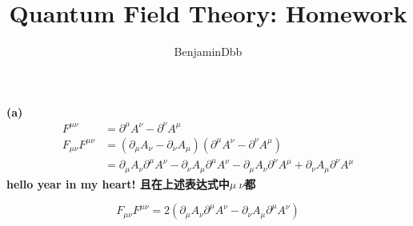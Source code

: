\documentclass{article}
\title{Quantum Field Theory: Homework}
\author{BenjaminDbb}
\begin{document}
\maketitle

\section{}
\bf{(a)}
\begin{align}
F^{\mu \nu} 			&= \partial^{\mu} A^{\nu} - \partial^{\nu} A^{\mu}  \nonumber \\
F_{\mu \nu} F^{\mu \nu} &= ({\partial_{\mu} A_{\nu} - \partial_{\nu} A_{\mu}}) ({\partial^{\mu} A^{\nu} - \partial^{\nu} A^{\mu}}) \nonumber \\
						&= \partial_{\mu} A_{\nu} \partial^{\mu} A^{\nu} - \partial_{\nu} A_{\mu} \partial^{\mu} A^{\nu} - 
						\partial_{\mu} A_{\nu} \partial^{\nu} A^{\mu} + \partial_{\nu} A_{\mu} \partial^{\nu} A^{\mu} \nonumber
\end{align}
hello year in my heart!
且在上述表达式中$\mu \: \nu$都

\begin{equation}
F_{\mu \nu} F^{\mu \nu} = 2(\partial_{\mu} A_{\nu} \partial^{\mu} A^{\nu} - \partial_{\nu} A_{\mu} \partial^{\mu} A^{\nu})
\end{equation}
\end{document}
